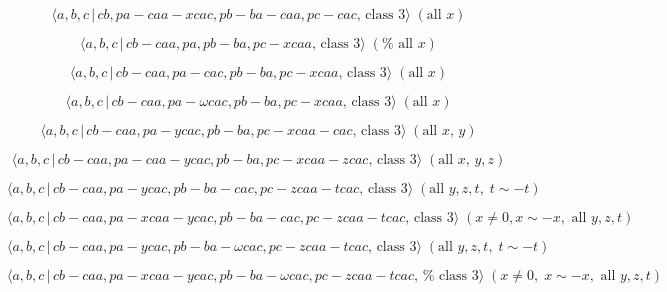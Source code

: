 \documentclass[10pt]{article}
\begin{document}
\begin{equation}
\langle a,b,c\,|\,cb,pa-caa-xcac,pb-ba-caa,pc-cac,\,\text{class }3\rangle \;(%
\text{all }x)  \tag{7.864}
\end{equation}

\begin{equation}
\langle a,b,c\,|\,cb-caa,pa,pb-ba,pc-xcaa,\,\text{class }3\rangle \;(\text{%
all }x)  \tag{7.865}
\end{equation}

\begin{equation}
\langle a,b,c\,|\,cb-caa,pa-cac,pb-ba,pc-xcaa,\,\text{class }3\rangle \;(%
\text{all }x)  \tag{7.866}
\end{equation}

\begin{equation}
\langle a,b,c\,|\,cb-caa,pa-\omega cac,pb-ba,pc-xcaa,\,\text{class }3\rangle
\;(\text{all }x)  \tag{7.867}
\end{equation}

\begin{equation}
\langle a,b,c\,|\,cb-caa,pa-ycac,pb-ba,pc-xcaa-cac,\,\text{class }3\rangle
\;(\text{all }x,\,y)  \tag{7.868}
\end{equation}

\begin{equation}
\langle a,b,c\,|\,cb-caa,pa-caa-ycac,pb-ba,pc-xcaa-zcac,\,\text{class }%
3\rangle \;(\text{all }x,\,y,z)  \tag{7.869}
\end{equation}

\begin{equation}
\langle a,b,c\,|\,cb-caa,pa-ycac,pb-ba-cac,pc-zcaa-tcac,\,\text{class }%
3\rangle \;(\text{all }y,z,t,\;t\sim -t)  \tag{7.870}
\end{equation}

\begin{equation}
\langle a,b,c\,|\,cb-caa,pa-xcaa-ycac,pb-ba-cac,pc-zcaa-tcac,\,\text{class }%
3\rangle \;(x\neq 0,x\sim -x,\text{ all }y,z,t)  \tag{7.871}
\end{equation}

\begin{equation}
\langle a,b,c\,|\,cb-caa,pa-ycac,pb-ba-\omega cac,pc-zcaa-tcac,\,\text{class 
}3\rangle \;(\text{all }y,z,t,\;t\sim -t)  \tag{7.872}
\end{equation}

\begin{equation}
\langle a,b,c\,|\,cb-caa,pa-xcaa-ycac,pb-ba-\omega cac,pc-zcaa-tcac,\,\text{%
class }3\rangle \;(x\neq 0,\;x\sim -x,\text{ all }y,z,t)  \tag{7.873}
\end{equation}
\end{document}
